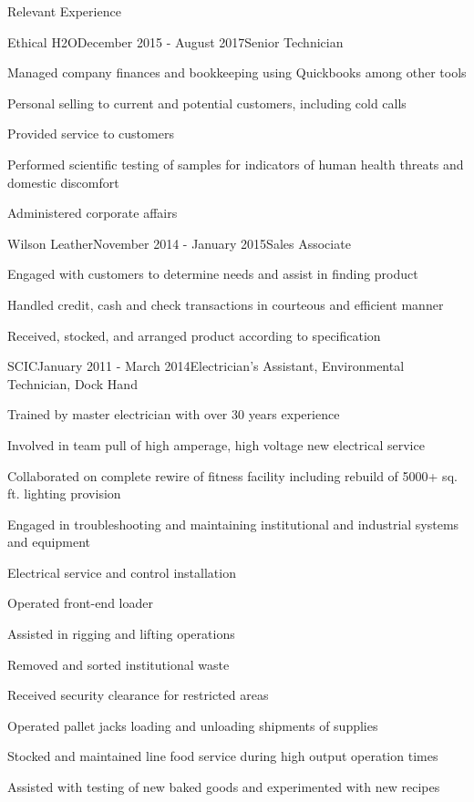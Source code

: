 \documentclass{resume} %
\begin{document}
\begin{rSection}{Relevant Experience}

\begin{rSubsection}{Ethical H2O}{December 2015 - August 2017}{Senior Technician}{}
\item Managed company finances and bookkeeping using Quickbooks among other tools
\item Personal selling to current and potential customers, including cold calls
\item Provided service to customers
\item Performed scientific testing of samples for indicators of human health threats and domestic discomfort
\item Administered corporate affairs
\end{rSubsection}


\begin{rSubsection}{Wilson Leather}{November 2014 - January 2015}{Sales Associate}{}
\item Engaged with customers to determine needs and assist in finding product
\item Handled credit, cash and check transactions in courteous and efficient manner
\item Received, stocked, and arranged product according to specification
\end{rSubsection}


\begin{rSubsection}{SCIC}{January 2011 - March 2014}{Electrician's Assistant, Environmental Technician, Dock Hand}{}
\item Trained by master electrician with over 30 years experience
\item Involved in team pull of high amperage, high voltage new electrical service
\item Collaborated on complete rewire of fitness facility including rebuild of 5000+ sq. ft. lighting provision
\item Engaged in troubleshooting and maintaining institutional and industrial systems and equipment
\item Electrical service and control installation
\item Operated front-end loader
\item Assisted in rigging and lifting operations
\item Removed and sorted institutional waste
\item Received security clearance for restricted areas
\item Operated pallet jacks loading and unloading shipments of supplies
\item Stocked and maintained line food service during high output operation times
\item Assisted with testing of new baked goods and experimented with new recipes
\end{rSubsection}

\end{rSection}
\end{document}
